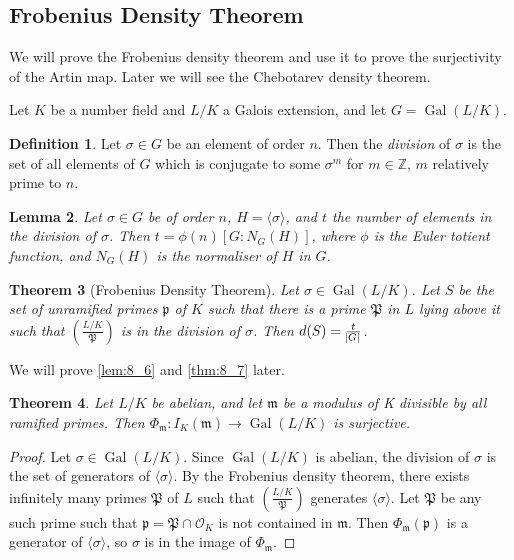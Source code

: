 \documentclass[11pt]{article}
\theoremstyle{definition}
\newtheorem{definition}{Definition}[section]
\theoremstyle{plain}
\newtheorem{theorem}[definition]{Theorem}
\newtheorem{lemma}[definition]{Lemma}
\theoremstyle{remark}
\DeclareMathOperator{\Gal}{Gal}
\newcommand{\ZZ}{\mathbb{Z}}
\newcommand{\cO}{\mathcal{O}}
\newcommand{\cp}{\mathfrak{P}}
\newcommand{\fp}{\mathfrak{p}}
\newcommand{\fm}{\mathfrak{m}}
\newcommand{\leg}[2]{\left(\frac{#1}{#2}\right)}
\begin{document}
\subsection{Frobenius Density Theorem}

We will prove the Frobenius density theorem and use it to prove the surjectivity of the Artin map. Later we will see the Chebotarev density theorem.

Let $K$ be a number field and $L/K$ a Galois extension, and let $G = \Gal(L/K)$.

\begin{definition}\label{def:8_5}
    Let $\sigma \in G$ be an element of order $n$. Then the \emph{division} of $\sigma$ is the set of all elements of $G$ which is conjugate to some $\sigma^m$ for $m \in \ZZ$, $m$ relatively prime to $n$.
\end{definition}

\begin{lemma}\label{lem:8_6}
    Let $\sigma \in G$ be of order $n$, $H = \langle \sigma \rangle$, and $t$ the number of elements in the division of $\sigma$. Then $t = \phi(n) [G : N_G(H)]$, where $\phi$ is the Euler totient function, and $N_G(H)$ is the normaliser of $H$ in $G$.
\end{lemma}

\begin{theorem}[Frobenius Density Theorem]\label{thm:8_7}
    Let $\sigma \in \Gal(L/K)$. Let $S$ be the set of unramified primes $\fp$ of $K$ such that there is a prime $\cp$ in $L$ lying above it such that $\leg{L/K}{\cp}$ is in the division of $\sigma$. Then $d(S) = \frac{t}{\abs{G}}$.
\end{theorem}

\noindent We will prove \autoref{lem:8_6} and \autoref{thm:8_7} later.

\begin{theorem}\label{thm:8_8}
    Let $L/K$ be abelian, and let $\fm$ be a modulus of K divisible by all ramified primes. Then $\Phi_\fm : I_K(\fm) \to \Gal(L/K)$ is surjective.
\end{theorem}
\begin{proof}
    Let $\sigma \in \Gal(L/K)$. Since $\Gal(L/K)$ is abelian, the division of $\sigma$ is the set of generators of $\langle \sigma \rangle$. By the Frobenius density theorem, there exists infinitely many primes $\cp$ of $L$ such that $\leg{L/K}{\cp}$ generates $\langle \sigma \rangle$. Let $\cp$ be any such prime such that $\fp = \cp \cap \cO_K$ is not contained in $\fm$. Then $\Phi_\fm(\fp)$ is a generator of $\langle \sigma \rangle$, so $\sigma$ is in the image of $\Phi_\fm$.
\end{proof}
\end{document}
